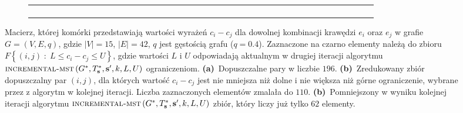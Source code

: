 {\begin{figure}[!htbp]
\begin{subfigure}[b]{0.3\textwidth}
{\begin{tabu}{|c|c|c|c|c|c|c|c|c|c|c|c|c|c|c|c|c|c|c|c|c|c|c|c|c|c|c|c|c|c|c|c|c|c|c|c|c|c|c|c|c|c|}
				& & & & & & & & & & & & & & & & & & & & & & & & & & & & & & & & & & & & & & & & & \\\hline
				& & \cellcolor{black}	& & 	& & 	& & 	& & & & & & & & & & & & & \cellcolor{black}	& 	& & & 	& & 	& & & 	& & 	& 	& 	& & 	& & & & & 	\\\hline
				& & & & & & & & & & & & & & & & & & & & & & & & & & & & & & & & & & & & & & & & & \\\hline
				& & & & & & & & & & & & & & & & & & & & & & & & & & & & & & & & & & & & & & & & & \\\hline
				& & & & & & & & & & & & & & & & & & & & & & & & & & & & & & & & & & & & & & & & & \\\hline
			\end{tabu}%
		}
		\caption{}
		\label{fig:imstSeed2:c}
	\end{subfigure}
	\hfill\null
	\caption{
		Macierz, której komórki przedstawiają wartości wyrażeń $c_{i} - c_{j}$ dla dowolnej kombinacji krawędzi $e_{i}$ oraz $e_{j}$ w grafie $G = \left( V, E, q \right)$, gdzie $\left| V \right| = 15$, $\left| E \right| = 42$, $q$ jest gęstością grafu ($q = 0.4$). Zaznaczone na czarno elementy należą do zbioru $F \left\{ \left( i, j \right) \; : \; L \leqslant c_{i} - c_{j} \leqslant U \right\}$, gdzie wartości $L$ i $U$ odpowiadają aktualnym w drugiej iteracji algorytmu $\textsc{incremental-mst} \left( G^{\ast}, T^{\ast}_{\textbf{s}}, \textbf{s}^{\prime}, k, L, U \right)$ ograniczeniom.
		\textbf{(a)}~Dopuszczalne pary  w liczbie $196$.
		\textbf{(b)}~Zredukowany zbiór dopuszczalny par $\left( i, j \right)$, dla których wartość $c_{i} - c_{j}$ jest nie mniejsza niż dolne i nie większa niż górne ograniczenie, wybrane przez z algorytm w kolejnej iteracji. Liczba zaznaczonych elementów zmalała do $110$.
		\textbf{(b)}~Pomniejszony w wyniku kolejnej iteracji algorytmu $\textsc{incremental-mst} \left( G^{\ast}, T^{\ast}_{\textbf{s}}, \textbf{s}^{\prime}, k, L, U \right)$ zbiór, który liczy już tylko $62$ elementy.
	}
	\label{fig:imstSeed2}
\end{figure}

}
